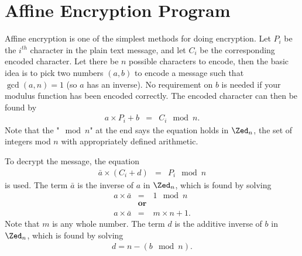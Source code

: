 \section{Affine Encryption Program}\label{s-affine}

Affine encryption is one of the simplest methods for doing encryption.  Let $P_i$ be the $i^{th}$ character in the plain text message, and let $C_i$ be the corresponding encoded character.  Let there be $n$ possible characters to encode, then the basic idea is to pick two numbers $(a,b)$ to encode a message such that $\gcd(a,n)=1$ (so $a$ has an inverse).  No requirement on $b$ is needed if your modulus function has been encoded correctly.  The encoded character can then be found by
\begin{eqnarray*}
  a\times P_i +b &=& C_i \mod n.
\end{eqnarray*}
Note that the "$\mod n$" at the end says the equation holds in $\Zed_n$, the set of integers mod $n$ with appropriately defined arithmetic.

To decrypt the message, the equation
\begin{eqnarray*}
  \bar a\times (C_i +d) &=& P_i \mod n
\end{eqnarray*}
is used.  The term $\bar a$ is the inverse of $a$ in $\Zed_n$, which is found by solving
\begin{eqnarray*}
  a\times\bar a &=& 1 \mod n \\
   & \textbf{or} & \\
  a\times\bar a &=& m\times n+1.
\end{eqnarray*}
Note that $m$ is any whole number.  The term $d$ is the additive inverse of $b$ in $\Zed_n$, which is found by solving
\begin{eqnarray*}
  d=n-(b \mod n).
\end{eqnarray*}

